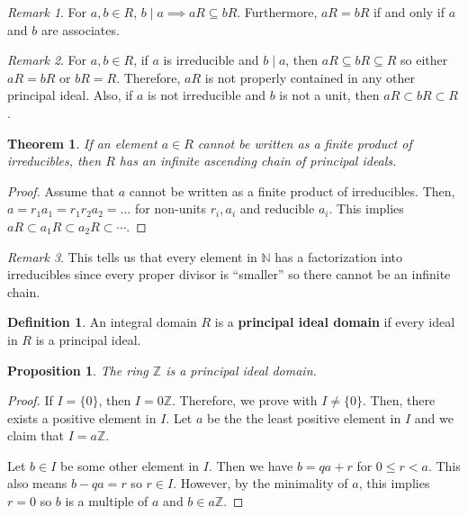 \documentclass[parskip=half]{scrartcl}  %
\theoremstyle{definition}
\newtheorem{definition}{Definition}[section]
\theoremstyle{plain}
\newtheorem{theorem}{Theorem}[definition]
\newtheorem{proposition}{Proposition}[definition]
\theoremstyle{remark}
\newtheorem{remark}{Remark}[definition]
\begin{document}
\begin{remark}
    For $a,b\in R$, $b\mid a\implies aR\subseteq bR$.
    Furthermore, $aR=bR$ if and only if $a$ and $b$ are associates.
\end{remark}

\begin{remark}
    For $a,b\in R$, if $a$ is irreducible and $b\mid a$, then
    $aR\subseteq bR\subseteq R$ so either $aR=bR$ or $bR=R$.
    Therefore, $aR$ is not properly contained in any other principal ideal.
    Also, if $a$ is not irreducible and $b$ is not a unit, then
    $aR\subset bR\subset R$.
\end{remark}

\begin{theorem}
    If an element $a\in R$ cannot be written as a finite product of
    irreducibles, then $R$ has an infinite ascending chain of principal ideals.
\end{theorem}

\begin{proof}
    Assume that $a$ cannot be written as a finite product of irreducibles.
    Then, $a=r_1a_1=r_1r_2a_2=\dots$ for non-units $r_i,a_i$ and reducible $a_i$.
    This implies $aR\subset a_1R\subset a_2R\subset\cdots$.
\end{proof}

\begin{remark}
    This tells us that every element in $\mathbb{N}$ has a factorization into
    irreducibles since every proper divisor is ``smaller'' so there cannot be
    an infinite chain.
\end{remark}

\begin{definition}
    An integral domain $R$ is a \textbf{principal ideal domain} if every ideal
    in $R$ is a principal ideal.
\end{definition}

\begin{proposition}
    \label{thm:integers is principal ideal domain}
    The ring $\mathbb{Z}$ is a principal ideal domain.
\end{proposition}

\begin{proof}
    If $I=\{0\}$, then $I=0\mathbb{Z}$.
    Therefore, we prove with $I\neq\{0\}$.
    Then, there exists a positive element in $I$.
    Let $a$ be the the least positive element in $I$ and we claim that
    $I=a\mathbb{Z}$.

    Let $b\in I$ be some other element in $I$.
    Then we have $b = qa + r$ for $0\leq r<a$.
    This also means $b-qa=r$ so $r\in I$.
    However, by the minimality of $a$, this implies $r=0$ so $b$ is a multiple
    of $a$ and $b\in a\mathbb{Z}$.
\end{proof}
\end{document}
